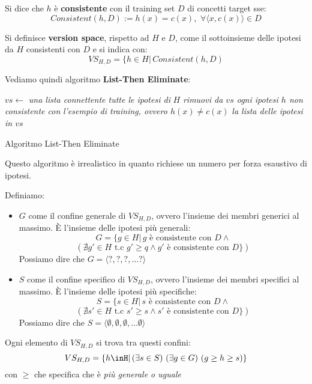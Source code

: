 \documentclass[a4paper,12pt, oneside]{book}
\begin{document}
\begin{definizione}
  Si dice che $h$ è \textbf{consistente} con il training set $D$ di concetti
  target sse: 
  \[Consistent(h,D):=h(x)=c(x),\,\,\forall \langle x,c(x)\rangle\in D\]
\end{definizione}
\begin{definizione}
  Si definisce \textbf{version space}, rispetto ad $H$ e $D$, come il
  sottoinsieme delle ipotesi da $H$ consistenti con $D$ e si indica con:
  \[VS_{H,D}=\{h\in H|\,Consistent(h,D)\]
\end{definizione}
Vediamo quindi algoritmo \textbf{List-Then Eliminate}:
\begin{algorithm}[H]
  \begin{algorithmic}
    \State $vs \gets$ \textit{una lista connettente tutte le ipotesi di } $H$
    \State \textit{rimuovi da $vs$ ogni ipotesi $h$ non consistente con}
    \State \textit{l'esempio di training, ovvero $h(x)\neq c(x)$}
    \EndFor
    \Return \textit{la lista delle ipotesi in $vs$}
    \EndFunction
  \end{algorithmic}
  \caption{Algoritmo List-Then Eliminate}
\end{algorithm}
Questo algoritmo è irrealistico in quanto richiese un numero per forza esaustivo
di ipotesi.\\
\begin{definizione}
  Definiamo:
  \begin{itemize}
    \item $G$ come il confine generale di $VS_{H,D}$, ovvero l'insieme dei
    membri generici al massimo. È l'insieme delle ipotesi più generali:
    \[G=\{g\in H|\, g\mbox{ è consistente con }D \land\]
    \[ (\nexists g'\in H \mbox{ t.c } g'\geq q \land g'\mbox{ è consistente con
      }D\})\]
    Possiamo dire che $G=\langle ?,?,?,\ldots ?\rangle$
    \item $S$ come il confine specifico di $VS_{H,D}$, ovvero l'insieme dei
    membri specifici al massimo. È l'insieme delle ipotesi più specifiche:
     \[S=\{s\in H|\, s\mbox{ è consistente con }D \land\]
    \[ (\nexists s'\in H \mbox{ t.c } s'\geq s \land s'\mbox{ è consistente con
      }D\})\]
    Possiamo dire che $S=\langle \emptyset,\emptyset,\emptyset,\ldots \emptyset
    \rangle$ 
  \end{itemize}
  Ogni elemento di $VS_{H,D}$ si trova tra questi confini:
  \[VS_{H,D}=\{h\inH|\,(\exists s\in S)\,\,(\exists g\in G)\,\,(g\geq h\geq
    s)\}\]
  con $\geq$ che specifica che è \textit{più generale o uguale}
\end{definizione}
\end{document}
